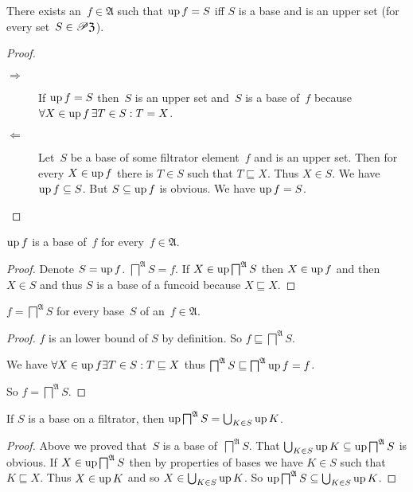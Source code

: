 \begin{prop}
There exists an~$f\in\mathfrak{A}$ such that $\operatorname{up} f=S$ iff $S$ is a base and is an upper set
(for every set~$S\in\mathscr{P}\mathfrak{Z}$).
\end{prop}

\begin{proof}
~
\begin{description}
\item[$\Rightarrow$] If $\operatorname{up} f=S$ then~$S$ is an upper set and~$S$ is a base of~$f$ because
  $\forall X\in\operatorname{up} f\,\exists T\in S:T=X$.

\item[$\Leftarrow$] Let~$S$ be a base of some filtrator element~$f$ and is an upper set.
Then for every $X\in\operatorname{up} f$ there is $T\in S$ such that $T\sqsubseteq X$.
Thus $X\in S$. We have $\operatorname{up} f\subseteq S$. But $S\subseteq\operatorname{up} f$ is obvious.
We have $\operatorname{up} f=S$.
\end{description}
\end{proof}

\begin{prop}
$\operatorname{up} f$ is a base of~$f$ for every~$f\in\mathfrak{A}$.
\end{prop}

\begin{proof}
Denote $S=\operatorname{up} f$.
$\bigsqcap^{\mathfrak{A}} S = f$.
If $X \in \operatorname{up} \bigsqcap^{\mathfrak{A}} S$ then $X \in \operatorname{up}
f$ and then $X \in S$ and thus $S$ is a base of a funcoid because $X
\sqsubseteq X$.
\end{proof}

\begin{prop}
$f = \bigsqcap^{\mathfrak{A}} S$ for every base~$S$ of an~$f\in\mathfrak{A}$.
\end{prop}

\begin{proof}
$f$ is an lower bound of $S$ by definition. So $f \sqsubseteq
\bigsqcap^{\mathfrak{A}} S$.

We have $\forall X \in \operatorname{up} f \exists T \in S : T \sqsubseteq X$ thus
$\bigsqcap^{\mathfrak{A}} S \sqsubseteq \bigsqcap^{\mathfrak{A}}
\operatorname{up} f = f$.

So $f = \bigsqcap^{\mathfrak{A}} S$.
\end{proof}

\begin{prop}
If $S$ is a base on a filtrator, then
$\operatorname{up} \bigsqcap^{\mathfrak{A}} S = \bigcup_{K\in S}\operatorname{up} K$.
\end{prop}

\begin{proof}
Above we proved that~$S$ is a base of~$\bigsqcap^{\mathfrak{A}} S$.
That $\bigcup_{K\in S}\operatorname{up} K \subseteq \operatorname{up} \bigsqcap^{\mathfrak{A}} S$ is obvious.
If $X\in\operatorname{up}\bigsqcap^{\mathfrak{A}} S$ then by properties of bases we have
$K\in S$ such that $K\sqsubseteq X$. Thus $X\in\operatorname{up} K$ and so $X\in\bigcup_{K\in S}\operatorname{up} K$.
So $\operatorname{up} \bigsqcap^{\mathfrak{A}} S \subseteq \bigcup_{K\in S}\operatorname{up} K$.
\end{proof}

